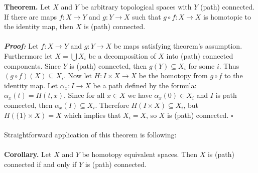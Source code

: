 \documentclass[12pt]{article}
\begin{document}
\textbf{Theorem.} Let $X$ and $Y$ be arbitrary topological spaces with $Y$ (path) connected. If there are maps $f:X\rightarrow Y$ and $g:Y\rightarrow X$ such that $g\circ f:X\rightarrow X$ is homotopic to the identity map, then $X$ is (path) connected.\\ \\
\textbf{\textit{Proof:}} Let $f:X\rightarrow Y$ and $g:Y\rightarrow X$ be maps satisfying theorem's assumption. Furthermore let $X=\bigcup X_i$ be a decomposition of $X$ into (path) connected components. Since $Y$ is (path) connected, then $g(Y)\subseteq X_i$ for some $i$. Thus $(g\circ f)(X)\subseteq X_i$. Now let $H:I\times X\rightarrow X$ be the homotopy from $g\circ f$ to the identity map. Let $\alpha_{x}:I\rightarrow X$ be a path defined by the formula: $\alpha_{x}(t)=H(t,x)$. Since for all $x\in X$ we have $\alpha_{x}(0)\in X_i$ and $I$ is path connected, then $\alpha_{x}(I)\subseteq X_i$. Therefore $H(I\times X)\subseteq X_i$, but $H(\{1\}\times X)=X$ which implies that $X_i=X$, so $X$ is (path) connected. $\square$ \\ \\
Straightforward application of this theorem is following:\\ \\
\textbf{Corollary.} Let $X$ and $Y$ be homotopy equivalent spaces. Then $X$ is (path) connected if and only if $Y$ is (path) connected.
\end{document}
